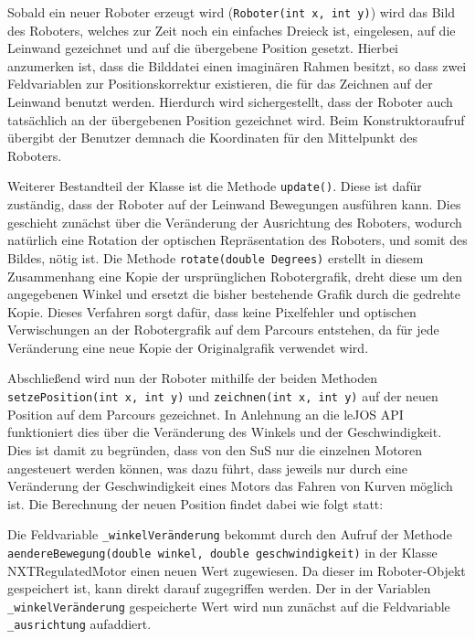 \documentclass[paper=a4, DIV=calc, BCOR=12mm, twoside=on, onecolumn=on, open = right, titlepage =on, parskip =half-, headsepline = on, footsepline = off, chapterprefix = off, appendixprefix = on, fontsize = 12pt, numbers = noenddot, abstract = on]{scrbook}
\begin{document}
Sobald ein neuer Roboter erzeugt wird (\texttt{Roboter(int x, int y)}) wird das Bild des Roboters, welches zur Zeit noch ein einfaches Dreieck ist, eingelesen, auf die Leinwand gezeichnet und auf die übergebene Position gesetzt. Hierbei anzumerken ist, dass die Bilddatei einen imaginären Rahmen besitzt, so dass zwei Feldvariablen zur Positionskorrektur existieren, die für das Zeichnen auf der Leinwand benutzt werden. Hierdurch wird sichergestellt, dass der Roboter auch tatsächlich an der übergebenen Position gezeichnet wird. Beim Konstruktoraufruf übergibt der Benutzer demnach die Koordinaten für den Mittelpunkt des Roboters.

Weiterer Bestandteil der Klasse ist die Methode \texttt{update()}. Diese ist dafür zuständig, dass der Roboter auf der Leinwand Bewegungen ausführen kann. Dies geschieht zunächst über die Veränderung der Ausrichtung des Roboters, wodurch natürlich eine Rotation der optischen Repräsentation des Roboters, und somit des Bildes, nötig ist. Die Methode \texttt{rotate(double Degrees)} erstellt in diesem Zusammenhang eine Kopie der ursprünglichen Robotergrafik, dreht diese um den angegebenen Winkel und ersetzt die bisher bestehende Grafik durch die gedrehte Kopie. Dieses Verfahren sorgt dafür, dass keine Pixelfehler und optischen Verwischungen an der Robotergrafik auf dem Parcours entstehen, da für jede Veränderung eine neue Kopie der Originalgrafik verwendet wird.

Abschließend wird nun der Roboter mithilfe der beiden Methoden \texttt{se\-tzePo\-si\-tion(int x, int y)} und \texttt{zeichnen(int x, int y)} auf der neuen Position auf dem Parcours gezeichnet. In Anlehnung an die leJOS API funktioniert dies über die Veränderung des Winkels und der Geschwindigkeit. Dies ist damit zu begründen, dass von den SuS nur die einzelnen Motoren angesteuert werden können, was dazu führt, dass jeweils nur durch eine Veränderung der Geschwindigkeit eines Motors das Fahren von Kurven möglich ist. Die Berechnung der neuen Position findet dabei wie folgt statt:

Die Feldvariable \texttt{{\_}win\-kel\-Ver\-än\-derung} bekommt durch den Aufruf der Methode \texttt{aen\-de\-re\-Be\-we\-gung(double win\-kel, double ge\-schwin\-dig\-keit)} in der Klasse NXTRegulatedMotor einen neuen Wert zugewiesen. Da dieser im Roboter-Objekt gespeichert ist, kann direkt darauf zugegriffen werden. Der in der Variablen \texttt{{\_}win\-kel\-Ver\-än\-derung} gespeicherte Wert wird nun zunächst auf die Feldvariable \texttt{{\_}ausrichtung} aufaddiert. 
\end{document}
